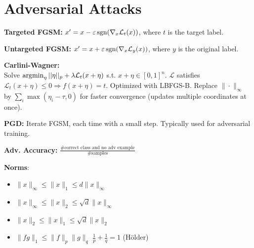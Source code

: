 \section{Adversarial Attacks}
\textbf{Targeted FGSM:} $x^\prime = x - \varepsilon \operatorname{\operatorname{sgn}}(\nabla_x \mathcal{L}_t(x))$, where $t$ is the target label.

\textbf{Untargeted FGSM:} $x^\prime = x + \varepsilon \operatorname{\operatorname{sgn}}(\nabla_x \mathcal{L}_y (x))$, where $y$ is the original label.

\textbf{Carlini-Wagner:}\\
Solve $\operatorname{\operatorname{argmin}}_\eta ||\eta||_p+\lambda \mathcal{L}_t(x+\eta)$ s.t. $x+\eta\in [0,1]^n$. $\mathcal{L}$ satisfies $\mathcal{L}_t(x+\eta)\le 0 \Rightarrow f(x+\eta)=t$. Optimized with LBFGS-B. Replace $\|\cdot\|_{\infty}$ by $\sum_i \max(\eta_i-\tau,0)$ for faster convergence (updates multiple coordinates at once).

\textbf{PGD:} Iterate FGSM, each time with a small step. Typically used for adversarial training.

\textbf{Adv. Accuracy:} $\frac{\#\text{correct class and no adv example}}{\#\text{samples}}$


\textbf{Norms}:
\begin{itemize}
    \item[] $\|x\|_\infty\leq\|x\|_1\leq d\|x\|_\infty$
    \item[] $\|x\|_\infty\leq\|x\|_2\leq\sqrt{d}\|x\|_\infty$
    \item[] $\|x\|_2\leq\|x\|_1\leq\sqrt{d}\|x\|_2$
    \item[] $\|fg\|_1\leq\|f\|_p\|g\|_q$  $\frac{1}{p}+\frac{1}{q}=1$ (Hölder)
\end{itemize}
